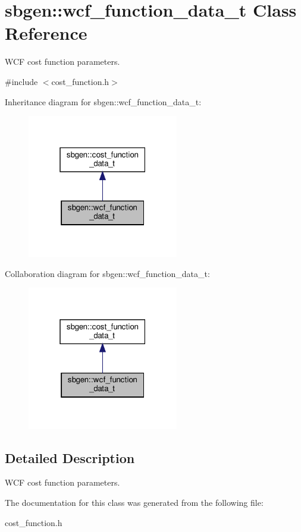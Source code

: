 \hypertarget{classsbgen_1_1wcf__function__data__t}{}\section{sbgen\+:\+:wcf\+\_\+function\+\_\+data\+\_\+t Class Reference}
\label{classsbgen_1_1wcf__function__data__t}


W\+CF cost function parameters.  




{\ttfamily \#include $<$cost\+\_\+function.\+h$>$}



Inheritance diagram for sbgen\+:\+:wcf\+\_\+function\+\_\+data\+\_\+t\+:
\nopagebreak
\begin{figure}[H]
\begin{center}
\leavevmode
\includegraphics[width=187pt]{classsbgen_1_1wcf__function__data__t__inherit__graph}
\end{center}
\end{figure}


Collaboration diagram for sbgen\+:\+:wcf\+\_\+function\+\_\+data\+\_\+t\+:
\nopagebreak
\begin{figure}[H]
\begin{center}
\leavevmode
\includegraphics[width=187pt]{classsbgen_1_1wcf__function__data__t__coll__graph}
\end{center}
\end{figure}


\subsection{Detailed Description}
W\+CF cost function parameters. 

The documentation for this class was generated from the following file\+:\begin{DoxyCompactItemize}
\item 
cost\+\_\+function.\+h\end{DoxyCompactItemize}
